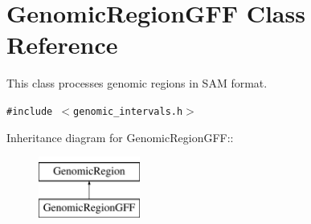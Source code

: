 \hypertarget{classGenomicRegionGFF}{
\section{GenomicRegionGFF Class Reference}
\label{classGenomicRegionGFF}
}
This class processes genomic regions in SAM format.  


{\tt \#include $<$genomic\_\-intervals.h$>$}

Inheritance diagram for GenomicRegionGFF::\begin{figure}[H]
\begin{center}
\leavevmode
\includegraphics[height=2cm]{classGenomicRegionGFF}
\end{center}
\end{figure}
